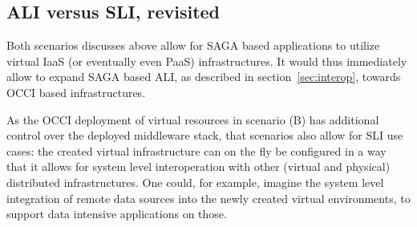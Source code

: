 \documentclass[10pt,conference,final,letterpaper,twoside,twocolumn,]{IEEEtran}
\newcommand{\I}[1]{\textit{#1}}
\newcommand{\B}[1]{\textbf{#1}}
\begin{document}
 \subsection{ALI versus SLI, revisited}

 Both scenarios discusses above allow for SAGA based applications to
 utilize virtual IaaS (or eventually even PaaS) infrastructures.  It
 would thus immediately allow to expand SAGA based ALI, as described
 in section~\ref{sec:interop}, towards OCCI based infrastructures.

 As the OCCI deployment of virtual resources in scenario (B)
 has additional control over the deployed middleware stack, that
 scenarios also allow for SLI use cases: the created virtual
 infrastructure can on the fly be configured in a way that it allows
 for system level interoperation with other (virtual and physical)
 distributed infrastructures.  One could, for example, imagine the
 system level integration of remote data sources into the newly
 created virtual environments, to support data intensive applications
 on those.

\end{document}
